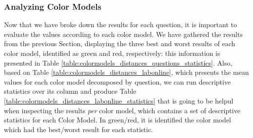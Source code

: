 \subsubsection{Analyzing Color Models}
\label{subsubsec:models_analyzing}
%
Now that we have broke down the results for each question, it is important to evaluate the values according to each color model. We have gathered
the results from the previous Section, displaying the three best and worst results of each color model, identified as green and red, respectively:
this information is presented in Table \ref{table:colormodels_distances_questions_statistics}. Also, based on Table \ref{table:colormodels_distances_labonline},
which presents the mean values for each color model decomposed by question, we can run descriptive statistics over its column and produce Table
\ref{table:colormodels_distances_labonline_statistics} that is going to be helpul when inspecting the results \emph{per} color model, which contains
a set of descriptive statistics for each Color Model. In green/red, it is identified the color model which had the best/worst result for each statistic. \par
%
